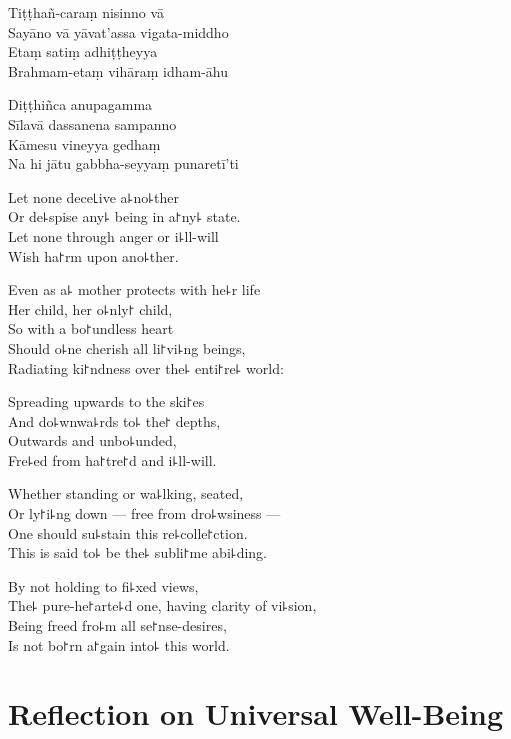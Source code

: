 Tiṭṭhañ-caraṃ nisinno vā\\
Sayāno vā yāvat'assa vigata-middho\\
Etaṃ satiṃ adhiṭṭheyya\\
Brahmam-etaṃ vihāraṃ idham-āhu

Diṭṭhiñca anupagamma\\
Sīlavā dassanena sampanno\\
Kāmesu vineyya gedhaṃ\\
Na hi jātu gabbha-seyyaṃ punaretī'ti

\clearpage

Let none dece꜖ive a꜕no꜕ther\\%
Or de꜕spise any꜕ being in a꜓ny꜕ state.\\
Let none through anger or i꜕ll-will\\
Wish ha꜓rm upon ano꜕ther.

Even as a꜕ mother protects with he꜕r life\\
Her child, her o꜕nly꜓ child,\\
So with a bo꜓undless heart\\
Should o꜕ne cherish all li꜓vi꜕ng beings,\\
Radiating ki꜓ndness over the꜕ enti꜓re꜕ world:

Spreading upwards to the ski꜓es\\
And do꜕wnwa꜕rds to꜕ the꜓ depths,\\
Outwards and unbo꜕unded,\\
Fre꜕ed from ha꜓tre꜓d and i꜕ll-will.

Whether standing or wa꜕lking, seated, \\
Or ly꜓i꜕ng down --- free from dro꜕wsiness ---\\
One should su꜕stain this re꜕colle꜓ction.\\
This is said to꜕ be the꜕ subli꜓me abi꜕ding.

By not holding to fi꜕xed views,\\
The꜕ pure-he꜓arte꜕d one, having clarity of vi꜕sion,\\
Being freed fro꜕m all se꜓nse-desires,\\
Is not bo꜓rn a꜓gain into꜕ this world.

\chapter*[Universal Well-Being]{Reflection on Universal Well-Being}%

\delegateSetUseNext


